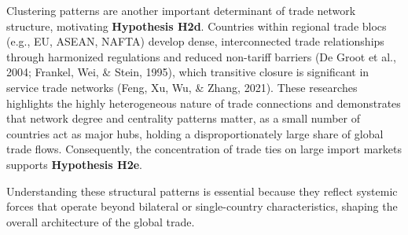 \documentclass[
]{article}
\begin{document}
\begin{enumerate}
  Clustering patterns are another important determinant of trade network
  structure, motivating \textbf{Hypothesis H2d}. Countries within
  regional trade blocs (e.g., EU, ASEAN, NAFTA) develop dense,
  interconnected trade relationships through harmonized regulations and
  reduced non-tariff barriers (De Groot et al., 2004; Frankel, Wei, \&
  Stein, 1995), which transitive closure is significant in service trade
  networks (Feng, Xu, Wu, \& Zhang, 2021). These researches highlights
  the highly heterogeneous nature of trade connections and demonstrates
  that network degree and centrality patterns matter, as a small number
  of countries act as major hubs, holding a disproportionately large
  share of global trade flows. Consequently, the concentration of trade
  ties on large import markets supports \textbf{Hypothesis H2e}.
\end{enumerate}

Understanding these structural patterns is essential because they
reflect systemic forces that operate beyond bilateral or single-country
characteristics, shaping the overall architecture of the global trade.
\end{document}
